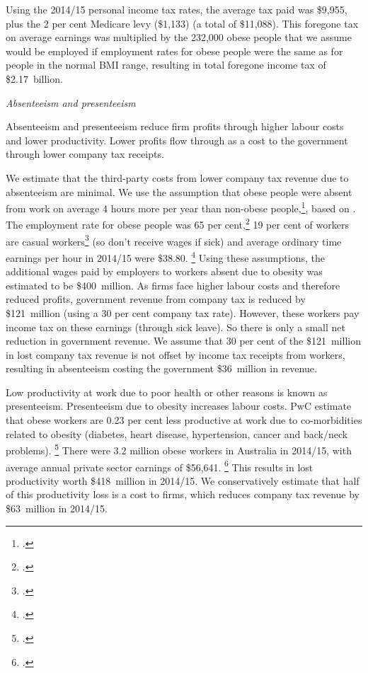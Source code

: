 \documentclass[embargoed]{grattan}
\begin{document}
Using the 2014/15 personal income tax rates, the average tax paid was \$9,955, plus the 2 per cent Medicare levy (\$1,133) (a total of \$11,088).
This foregone tax on average earnings was multiplied by the 232,000 obese people that we assume would be employed if employment rates for obese people were the same as for people in the normal BMI range, resulting in total foregone income tax of \$2.17~billion.

\emph{Absenteeism and presenteeism}

Absenteeism and presenteeism reduce firm profits through higher labour costs and lower productivity.
Lower profits flow through as a cost to the government through lower company tax receipts.

We estimate that the third-party costs from lower company tax revenue due to absenteeism are minimal.
We use the assumption that obese people were absent from work on average 4 hours more per year than non-obese people,\footcite[][55]{PwC2015Weighingcostobesity}, based on \textcite{ABS20134364055002AustralianHealth}.
The employment rate for obese people was 65 per cent,\footcite{ABS2013436405503AustralianHealth} 19 per cent of workers are casual workers\footcite{ABS201563333} (so don't receive wages if sick) and average ordinary time earnings per hour in 2014/15 were \$38.80.%
\footcite{ABS201663020AverageWeekly} Using these assumptions, the additional wages paid by employers to workers absent due to obesity was estimated to be \$400~million.
As firms face higher labour costs and therefore reduced profits, government revenue from company tax is reduced by \$121~million (using a 30 per cent company tax rate).
However, these workers pay income tax on these earnings (through sick leave).
So there is only a small net reduction in government revenue.
We assume that 30 per cent of the \$121~million in lost company tax revenue is not offset by income tax receipts from workers, resulting in absenteeism costing the government \$36~million in revenue.

Low productivity at work due to poor health or other reasons is known as presenteeism.
Presenteeism due to obesity increases labour costs.
PwC estimate that obese workers are 0.23 per cent less productive at work due to co-morbidities related to obesity (diabetes, heart disease, hypertension, cancer and back/neck problems).%
\footcite[][56]{PwC2015Weighingcostobesity} There were 3.2 million obese workers in Australia in 2014/15, with average annual private sector earnings of \$56,641.%
\footcite{ABS201663020AverageWeekly} This results in lost productivity worth \$418~million in 2014/15.
We conservatively estimate that half of this productivity loss is a cost to firms, which reduces company tax revenue by \$63~million in 2014/15.
\end{document}
